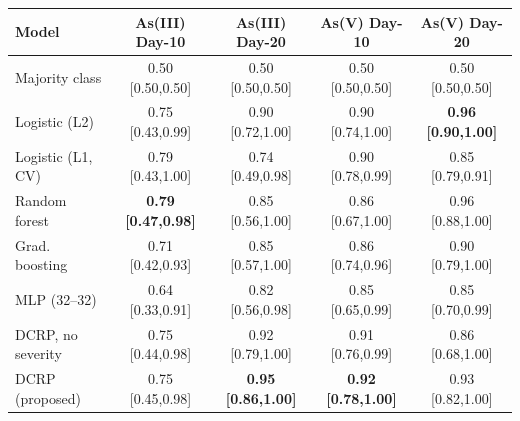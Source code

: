 \begin{tabular}{lcccc}
  \toprule
  Model & As(III) Day-10 & As(III) Day-20 & As(V) Day-10 & As(V) Day-20 \\
  \midrule
  Majority class & 0.50 [0.50,0.50] & 0.50 [0.50,0.50] & 0.50 [0.50,0.50] & 0.50 [0.50,0.50] \\
  Logistic (L2) & 0.75 [0.43,0.99] & 0.90 [0.72,1.00] & 0.90 [0.74,1.00] & \textbf{0.96 [0.90,1.00]} \\
  Logistic (L1, CV) & 0.79 [0.43,1.00] & 0.74 [0.49,0.98] & 0.90 [0.78,0.99] & 0.85 [0.79,0.91] \\
  Random forest & \textbf{0.79 [0.47,0.98]} & 0.85 [0.56,1.00] & 0.86 [0.67,1.00] & 0.96 [0.88,1.00] \\
  Grad. boosting & 0.71 [0.42,0.93] & 0.85 [0.57,1.00] & 0.86 [0.74,0.96] & 0.90 [0.79,1.00] \\
  MLP (32--32) & 0.64 [0.33,0.91] & 0.82 [0.56,0.98] & 0.85 [0.65,0.99] & 0.85 [0.70,0.99] \\
  DCRP, no severity & 0.75 [0.44,0.98] & 0.92 [0.79,1.00] & 0.91 [0.76,0.99] & 0.86 [0.68,1.00] \\
  DCRP (proposed) & 0.75 [0.45,0.98] & \textbf{0.95 [0.86,1.00]} & \textbf{0.92 [0.78,1.00]} & 0.93 [0.82,1.00] \\
  \bottomrule
\end{tabular}
